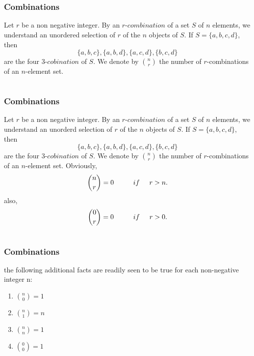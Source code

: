 \documentclass{beamer}
\begin{document}
\section{}
 \begin{frame}
\frametitle{Combinations}
Let $r$ be a non negative integer. By an $r$-$combination$ of a set $S$ of $n$ elements, we understand an unordered selection of $r$ of the $n$ objects of $S$. If $S= \{a,b,c,d\}$, then
$$ \{a,b,c\}  , \{a,b,d\} ,\{a,c,d\}, \{b,c,d\}$$
are the four 3-$cobination$ of $S$.
We denote by $\binom{n}{r}$ the number of $r$-combinations of an $n$-element set.
\end{frame}

\section{}
 \begin{frame}
\frametitle{Combinations}
Let $r$ be a non negative integer. By an $r$-$combination$ of a set $S$ of $n$ elements, we understand an unorderd selection of $r$ of the $n$ objects of $S$. If $S= \{a,b,c,d\}$, then
$$ \{a,b,c\}  , \{a,b,d\} ,\{a,c,d\}, \{b,c,d\}$$
are the four 3-$cobination$ of $S$.
We denote by $\binom{n}{r}$ the number of $r$-combinations of an $n$-element set. Obviously,
     \\ $$\binom{n}{r} = 0 \hspace{1cm} if \hspace{.5cm} r>n.$$
     also,   $$\binom{0}{r}=0 \hspace{1cm}  if \hspace{.5cm} r>0.$$

\end{frame}

\section{}
 \begin{frame}
\frametitle{Combinations}
 the following additional facts are readily seen to be true for each non-negative integer n:{\vspace{.8cm}}
    \begin{enumerate}
		     \item $\binom{n}{0} = 1${\vspace{.4cm}}
    		 \item $\binom{n}{1} = n${\vspace{.4cm}}
     		\item $\binom{n}{n} = 1 ${\vspace{.4cm}}
    		\item $\binom{0}{0} = 1${\vspace{.4cm}}
    	 \end{enumerate}
\end{frame}
\end{document}
